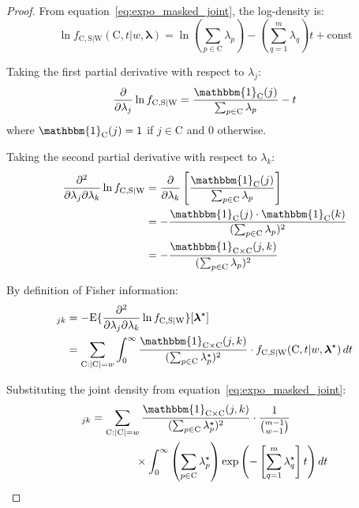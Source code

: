 \documentclass[12pt]{article}
\newcommand{\RV}[1]{\mathrm{#1}}
\newcommand{\Expect}[1]{\mathrm{E}\{#1\}}
\newcommand{\sv}{\RV{S}}           %
\newcommand{\cand}{\RV{C}}         %
\newcommand{\rvcand}{\RV{C}}       %
\newcommand{\tparam}[1]{{#1}^{\star}}  %
\newcommand{\infomatrx}{\mathcal{I}}
\newcommand{\pdf}{f}
\renewcommand{\vec}[1]{\boldsymbol{#1}}
\newcommand{\SetIndicator}[1]{\mathbbm{1}_{#1}}
\theoremstyle{definition}
\theoremstyle{remark}
\begin{document}
\begin{proof}
From equation~\eqref{eq:expo_masked_joint}, the log-density is:
\begin{equation}
\ln \pdf_{\rvcand, \sv | \RV{W}}(\cand, t | w, \vec{\lambda}) = \ln\left(\sum_{p \in \cand} \lambda_p\right) - \left(\sum_{q=1}^{m} \lambda_q\right) t + \text{const}
\end{equation}

Taking the first partial derivative with respect to $\lambda_j$:
\begin{equation}
\frac{\partial}{\partial \lambda_j} \ln \pdf_{\rvcand, \sv | \RV{W}} = \frac{\SetIndicator{\cand}(j)}{\sum_{p \in \cand} \lambda_p} - t
\end{equation}
where $\SetIndicator{\cand}(j) = 1$ if $j \in \cand$ and $0$ otherwise.

Taking the second partial derivative with respect to $\lambda_k$:
\begin{align}
\frac{\partial^2}{\partial \lambda_j \partial \lambda_k} \ln \pdf_{\rvcand, \sv | \RV{W}} &= \frac{\partial}{\partial \lambda_k}\left[\frac{\SetIndicator{\cand}(j)}{\sum_{p \in \cand} \lambda_p}\right] \nonumber\\
&= -\frac{\SetIndicator{\cand}(j) \cdot \SetIndicator{\cand}(k)}{(\sum_{p \in \cand} \lambda_p)^2} \nonumber\\
&= -\frac{\SetIndicator{\cand \times \cand}(j,k)}{(\sum_{p \in \cand} \lambda_p)^2}
\end{align}

By definition of Fisher information:
\begin{align}
[\infomatrx(\tparam{\vec{\lambda}} | w)]_{jk} &= -\Expect{\frac{\partial^2}{\partial \lambda_j \partial \lambda_k} \ln \pdf_{\rvcand, \sv | \RV{W}}}[\tparam{\vec{\lambda}}] \nonumber\\
&= \sum_{\cand: |\cand|=w} \int_0^\infty \frac{\SetIndicator{\cand \times \cand}(j,k)}{(\sum_{p \in \cand} \tparam{\lambda}_p)^2} \cdot \pdf_{\rvcand, \sv | \RV{W}}(\cand, t | w, \tparam{\vec{\lambda}}) \, dt
\end{align}

Substituting the joint density from equation~\eqref{eq:expo_masked_joint}:
\begin{align}
[\infomatrx(\tparam{\vec{\lambda}} | w)]_{jk} &= \sum_{\cand: |\cand|=w} \frac{\SetIndicator{\cand \times \cand}(j,k)}{(\sum_{p \in \cand} \tparam{\lambda}_p)^2} \cdot \frac{1}{\binom{m-1}{w-1}} \nonumber\\
&\qquad\qquad \times \int_0^\infty \left(\sum_{p \in \cand} \tparam{\lambda}_p\right) \exp\left(-\left[\sum_{q=1}^{m} \tparam{\lambda}_q\right] t\right) dt
\end{align}


\end{proof}
\end{document}
